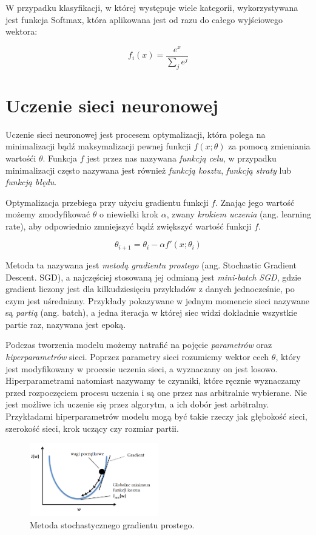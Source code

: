 \documentclass[licencjacka]{pracamgr}
\begin{document}
W przypadku klasyfikacji, w której występuje wiele kategorii, wykorzystywana jest funkcja Softmax, która aplikowana jest od razu do całego wyjściowego wektora:


$$ f_i(x) = \frac{e^x}{\sum_j e^j} $$


\section{Uczenie sieci neuronowej}

Uczenie sieci neuronowej jest procesem optymalizacji, która polega na minimalizacji bądź maksymalizacji pewnej funkcji $ f(x; \theta) $ za pomocą zmieniania wartośći $ \theta $. Funkcja $ f $ jest przez nas nazywana \emph{funkcją celu}, w przypadku minimalizacji często nazywana jest również \emph{funkcją kosztu}, \emph{funkcją straty} lub \emph{funkcją błędu}. 

Optymalizacja przebiega przy użyciu gradientu funkcji $ f $. Znając jego wartość możemy zmodyfikować $\theta$ o niewielki krok $ \alpha $, zwany \emph{krokiem uczenia} (ang. learning rate), aby odpowiednio zmniejszyć bądź zwiększyć wartość funkcji $ f $. 

$$ \theta_{i+1} = \theta_i - \alpha f'(x; \theta_i) $$

Metoda ta nazywana jest \emph{metodą gradientu prostego} (ang. Stochastic Gradient Descent. SGD), a najczęściej stosowaną jej odmianą jest \emph{mini-batch SGD}, gdzie gradient liczony jest dla kilkudziesięciu przykładów z danych jednocześnie, po czym jest uśredniany. Przykłady pokazywane w jednym momencie sieci nazywane są \emph{partią} (ang. batch), a jedna iteracja w której siec widzi dokładnie wszystkie partie raz, nazywana jest epoką.

Podczas tworzenia modelu możemy natrafić na pojęcie \emph{parametrów} oraz \emph{hiperparametrów} sieci. Poprzez parametry sieci rozumiemy wektor cech $\theta$, który jest modyfikowany w procesie uczenia sieci, a wyznaczany on jest losowo. Hiperparametrami natomiast nazywamy te czynniki, które ręcznie wyznaczamy przed rozpoczęciem procesu uczenia i są one przez nas arbitralnie wybierane. Nie jest możliwe ich uczenie się przez algorytm, a ich dobór jest arbitralny. Przykładami hiperparametrów modelu mogą być takie rzeczy jak głębokość sieci, szerokość sieci, krok uczący czy rozmiar partii.

\begin{figure}[ht]
  \centering
  \includegraphics[width=0.5\textwidth]{sgd}
  \caption{Metoda stochastycznego gradientu prostego.}
\end{figure}
\end{document}

